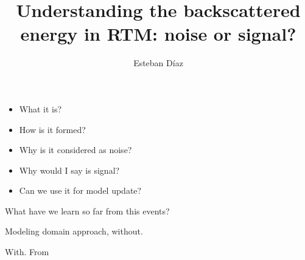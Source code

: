 




\title[]{Understanding the backscattered energy in RTM: noise or signal?}
\subtitle{}
\author[]{Esteban  D\'{i}az}
\date{}
\logo{}

\def\big#1{\begin{center} \LARGE \textbf{#1} \end{center}}
\def\cen#1{\begin{center}        \textbf{#1} \end{center}}


\setlength{\unitlength}{0.1cm} 

 { \cwpcover }



\begin{frame}
	\begin{itemize}
		\item What it is?  
		\item How is it formed?
		\item Why is it considered as noise?
		\item Why would I say is signal? 
		\item Can we use it for model update?
	\end{itemize}
\end{frame}




\begin{frame}
   What have we learn so far from this events?
\end{frame}

\begin{frame}
Modeling domain approach, without.

\end{frame}

\begin{frame}
With. From ~\cite{fletcher:2049}
\end{frame}


